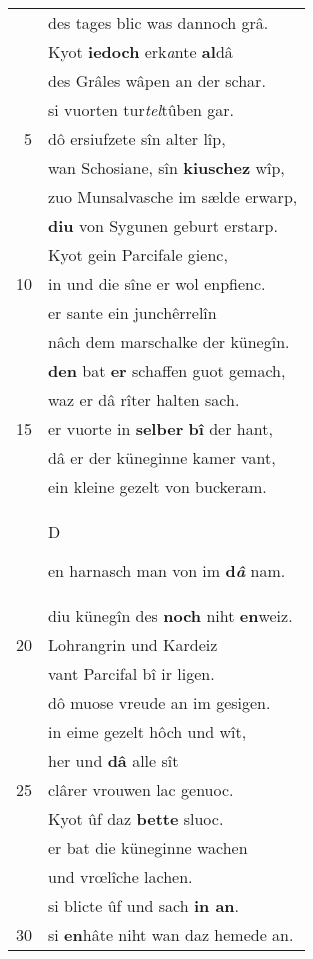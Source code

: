 \documentclass[8pt,a4paper,notitlepage]{article}
\begin{document}
\begin{table}[ht]
\begin{minipage}[t]{0.5\linewidth}
\begin{tabular}{rl}
 & des tages blic was dannoch grâ.\\ 
 & Kyot \textbf{iedoch} erk\textit{a}nte \textbf{al}dâ\\ 
 & des Grâles wâpen an der schar.\\ 
 & si vuorten tur\textit{tel}tûben gar.\\ 
5 & dô ersiufzete sîn alter lîp,\\ 
 & wan Schosiane, sîn \textbf{kiuschez} wîp,\\ 
 & zuo Munsalvasche im sælde erwarp,\\ 
 & \textbf{diu} von Sygunen geburt erstarp.\\ 
 & Kyot gein Parcifale gienc,\\ 
10 & in und die sîne er wol enpfienc.\\ 
 & er sante ein junchêrrelîn\\ 
 & nâch dem marschalke der künegîn.\\ 
 & \textbf{den} bat \textbf{er} schaffen guot gemach,\\ 
 & waz er dâ rîter halten sach.\\ 
15 & er vuorte in \textbf{selber} \textbf{bî} der hant,\\ 
 & dâ er der küneginne kamer vant,\\ 
 & ein kleine gezelt von buckeram.\\ 
 & \begin{large}D\end{large}en harnasch man von im \textbf{d\textit{â}} nam.\\ 
 & diu künegîn des \textbf{noch} niht \textbf{en}weiz.\\ 
20 & Lohrangrin und Kardeiz\\ 
 & vant Parcifal bî ir ligen.\\ 
 & dô muose vreude an im gesigen.\\ 
 & in eime gezelt hôch und wît,\\ 
 & her und \textbf{dâ} alle sît\\ 
25 & clârer vrouwen lac genuoc.\\ 
 & Kyot ûf daz \textbf{bette} sluoc.\\ 
 & er bat die küneginne wachen\\ 
 & und vrœlîche lachen.\\ 
 & si blicte ûf und sach \textbf{in an}.\\ 
30 & si \textbf{en}hâte niht wan daz hemede an.\\ 
\end{tabular}
\scriptsize

\end{minipage}
\end{table}
\end{document}
